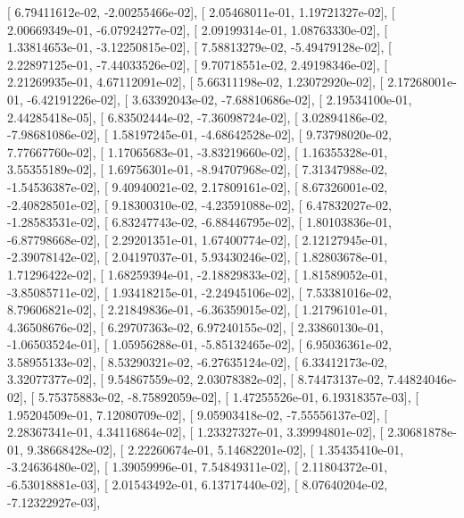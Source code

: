 \documentclass{article}
\begin{document}
       [  6.79411612e-02,  -2.00255466e-02],
       [  2.05468011e-01,   1.19721327e-02],
       [  2.00669349e-01,  -6.07924277e-02],
       [  2.09199314e-01,   1.08763330e-02],
       [  1.33814653e-01,  -3.12250815e-02],
       [  7.58813279e-02,  -5.49479128e-02],
       [  2.22897125e-01,  -7.44033526e-02],
       [  9.70718551e-02,   2.49198346e-02],
       [  2.21269935e-01,   4.67112091e-02],
       [  5.66311198e-02,   1.23072920e-02],
       [  2.17268001e-01,  -6.42191226e-02],
       [  3.63392043e-02,  -7.68810686e-02],
       [  2.19534100e-01,   2.44285418e-05],
       [  6.83502444e-02,  -7.36098724e-02],
       [  3.02894186e-02,  -7.98681086e-02],
       [  1.58197245e-01,  -4.68642528e-02],
       [  9.73798020e-02,   7.77667760e-02],
       [  1.17065683e-01,  -3.83219660e-02],
       [  1.16355328e-01,   3.55355189e-02],
       [  1.69756301e-01,  -8.94707968e-02],
       [  7.31347988e-02,  -1.54536387e-02],
       [  9.40940021e-02,   2.17809161e-02],
       [  8.67326001e-02,  -2.40828501e-02],
       [  9.18300310e-02,  -4.23591088e-02],
       [  6.47832027e-02,  -1.28583531e-02],
       [  6.83247743e-02,  -6.88446795e-02],
       [  1.80103836e-01,  -6.87798668e-02],
       [  2.29201351e-01,   1.67400774e-02],
       [  2.12127945e-01,  -2.39078142e-02],
       [  2.04197037e-01,   5.93430246e-02],
       [  1.82803678e-01,   1.71296422e-02],
       [  1.68259394e-01,  -2.18829833e-02],
       [  1.81589052e-01,  -3.85085711e-02],
       [  1.93418215e-01,  -2.24945106e-02],
       [  7.53381016e-02,   8.79606821e-02],
       [  2.21849836e-01,  -6.36359015e-02],
       [  1.21796101e-01,   4.36508676e-02],
       [  6.29707363e-02,   6.97240155e-02],
       [  2.33860130e-01,  -1.06503524e-01],
       [  1.05956288e-01,  -5.85132465e-02],
       [  6.95036361e-02,   3.58955133e-02],
       [  8.53290321e-02,  -6.27635124e-02],
       [  6.33412173e-02,   3.32077377e-02],
       [  9.54867559e-02,   2.03078382e-02],
       [  8.74473137e-02,   7.44824046e-02],
       [  5.75375883e-02,  -8.75892059e-02],
       [  1.47255526e-01,   6.19318357e-03],
       [  1.95204509e-01,   7.12080709e-02],
       [  9.05903418e-02,  -7.55556137e-02],
       [  2.28367341e-01,   4.34116864e-02],
       [  1.23327327e-01,   3.39994801e-02],
       [  2.30681878e-01,   9.38668428e-02],
       [  2.22260674e-01,   5.14682201e-02],
       [  1.35435410e-01,  -3.24636480e-02],
       [  1.39059996e-01,   7.54849311e-02],
       [  2.11804372e-01,  -6.53018881e-03],
       [  2.01543492e-01,   6.13717440e-02],
       [  8.07640204e-02,  -7.12322927e-03],
\end{document}
